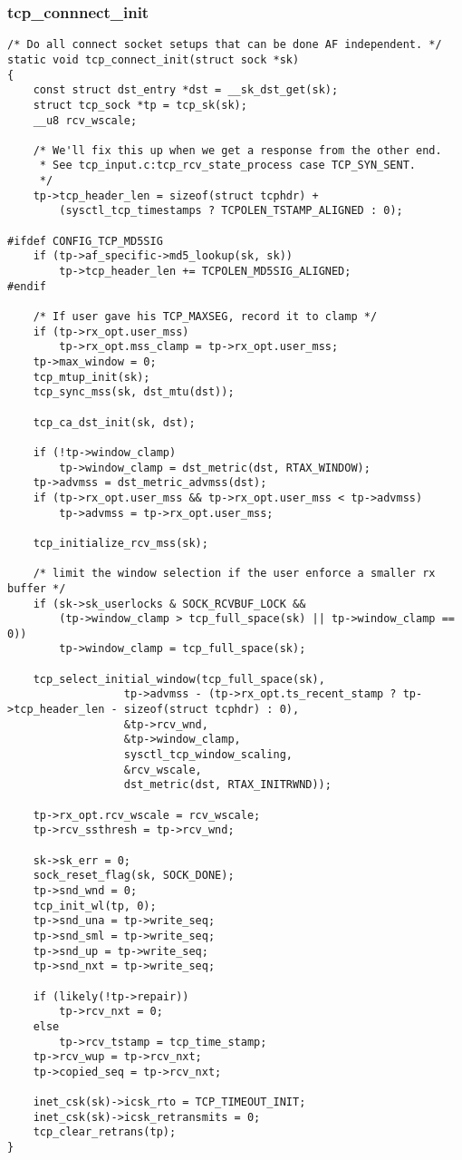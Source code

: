 		\subsubsection{tcp\_connnect\_init}
			\label{TCPInitialize:tcp_connect_init}
\begin{verbatim}
/* Do all connect socket setups that can be done AF independent. */
static void tcp_connect_init(struct sock *sk)
{
	const struct dst_entry *dst = __sk_dst_get(sk);
	struct tcp_sock *tp = tcp_sk(sk);
	__u8 rcv_wscale;

	/* We'll fix this up when we get a response from the other end.
	 * See tcp_input.c:tcp_rcv_state_process case TCP_SYN_SENT.
	 */
	tp->tcp_header_len = sizeof(struct tcphdr) +
		(sysctl_tcp_timestamps ? TCPOLEN_TSTAMP_ALIGNED : 0);

#ifdef CONFIG_TCP_MD5SIG
	if (tp->af_specific->md5_lookup(sk, sk))
		tp->tcp_header_len += TCPOLEN_MD5SIG_ALIGNED;
#endif

	/* If user gave his TCP_MAXSEG, record it to clamp */
	if (tp->rx_opt.user_mss)
		tp->rx_opt.mss_clamp = tp->rx_opt.user_mss;
	tp->max_window = 0;
	tcp_mtup_init(sk);
	tcp_sync_mss(sk, dst_mtu(dst));

	tcp_ca_dst_init(sk, dst);

	if (!tp->window_clamp)
		tp->window_clamp = dst_metric(dst, RTAX_WINDOW);
	tp->advmss = dst_metric_advmss(dst);
	if (tp->rx_opt.user_mss && tp->rx_opt.user_mss < tp->advmss)
		tp->advmss = tp->rx_opt.user_mss;

	tcp_initialize_rcv_mss(sk);

	/* limit the window selection if the user enforce a smaller rx buffer */
	if (sk->sk_userlocks & SOCK_RCVBUF_LOCK &&
	    (tp->window_clamp > tcp_full_space(sk) || tp->window_clamp == 0))
		tp->window_clamp = tcp_full_space(sk);

	tcp_select_initial_window(tcp_full_space(sk),
				  tp->advmss - (tp->rx_opt.ts_recent_stamp ? tp->tcp_header_len - sizeof(struct tcphdr) : 0),
				  &tp->rcv_wnd,
				  &tp->window_clamp,
				  sysctl_tcp_window_scaling,
				  &rcv_wscale,
				  dst_metric(dst, RTAX_INITRWND));

	tp->rx_opt.rcv_wscale = rcv_wscale;
	tp->rcv_ssthresh = tp->rcv_wnd;

	sk->sk_err = 0;
	sock_reset_flag(sk, SOCK_DONE);
	tp->snd_wnd = 0;
	tcp_init_wl(tp, 0);
	tp->snd_una = tp->write_seq;
	tp->snd_sml = tp->write_seq;
	tp->snd_up = tp->write_seq;
	tp->snd_nxt = tp->write_seq;

	if (likely(!tp->repair))
		tp->rcv_nxt = 0;
	else
		tp->rcv_tstamp = tcp_time_stamp;
	tp->rcv_wup = tp->rcv_nxt;
	tp->copied_seq = tp->rcv_nxt;

	inet_csk(sk)->icsk_rto = TCP_TIMEOUT_INIT;
	inet_csk(sk)->icsk_retransmits = 0;
	tcp_clear_retrans(tp);
}
\end{verbatim}

